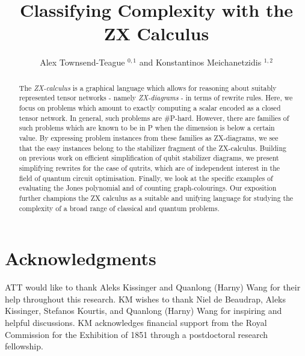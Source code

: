 \documentclass[submission,copyright,creativecommons]{eptcs}
\title{Classifying Complexity with the ZX Calculus}
\author{  Alex Townsend-Teague $^{0,1}$ and Konstantinos Meichanetzidis $^{1,2}$
\institute{$^0$ Mathematical Institute, University of Oxford}
\institute{$^1$ Department of Computer Science, University of Oxford}
\institute{$^2$ Cambridge Quantum Computing Ltd.} }
\begin{document}
\maketitle
\begin{abstract}
The \emph{ZX-calculus} is a graphical language which allows for reasoning about suitably represented tensor networks - namely \emph{ZX-diagrams} - in terms of rewrite rules.
Here, we focus on problems which amount to exactly computing
a scalar encoded as a closed tensor network.
In general, such problems are \#P-hard.
However, there are families of such problems which are known to be in P
when the dimension is below a certain value.
By expressing problem instances from these families as ZX-diagrams,
we see that the easy instances belong to the stabilizer fragment of the ZX-calculus.
Building on previous work on efficient simplification of qubit stabilizer diagrams, we present simplifying rewrites for the case of qutrits, which are of independent interest in the field of quantum circuit optimisation.
Finally, we look at the specific examples of evaluating the Jones polynomial
and of counting graph-colourings.
Our exposition further champions the ZX calculus as a suitable and unifying language for studying the complexity of
a broad range of classical and quantum problems.
\end{abstract}







\section{Acknowledgments}
ATT would like to thank Aleks Kissinger and Quanlong (Harny) Wang for their help throughout this research.
KM wishes to thank Niel de Beaudrap, Aleks Kissinger, Stefanos 
Kourtis, and Quanlong (Harny) Wang for inspiring and helpful discussions.
KM acknowledges financial support from the Royal Commission for the Exhibition of 1851 through a postdoctoral research fellowship.





% 
% 
% 
% 
% 
% 
\end{document}
